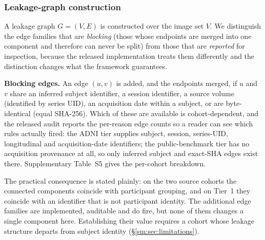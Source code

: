 \documentclass[11pt]{article}
\begin{document}
\subsubsection{Leakage-graph construction}
\label{sm:sec:leakage_graph}
A leakage graph $G = (V, E)$ is constructed over the image set $V$.
We distinguish the edge families that are \emph{blocking}
(those whose endpoints are merged into one component and therefore can
never be split) from those that are \emph{reported} for inspection, because the
released implementation treats them differently and the distinction
changes what the framework guarantees.

\textbf{Blocking edges.} An edge $(u,v)$ is added, and the endpoints
merged, if $u$ and $v$ share an inferred subject identifier, a session
identifier, a source volume (identified by series UID), an acquisition
date within a subject, or are byte-identical (equal SHA-256). Which of
these are available is cohort-dependent, and the released audit reports
the per-reason edge counts so a reader can see which rules actually
fired: the ADNI tier supplies subject, session, series-UID,
longitudinal and acquisition-date identifiers; the public-benchmark
tier has no acquisition provenance at all, so only inferred subject and
exact-SHA edges exist there. Supplementary Table~S5 gives the
per-cohort breakdown.


The practical consequence is stated plainly: on the two source
cohorts the connected components coincide with participant grouping,
and on Tier~1 they coincide with an identifier that is not
participant identity. The
additional edge families are implemented, auditable and do fire, but
none of them changes a single component here. Establishing their value
requires a cohort whose leakage structure departs from subject identity
(\S\ref{sm:sec:limitations}).
\end{document}
